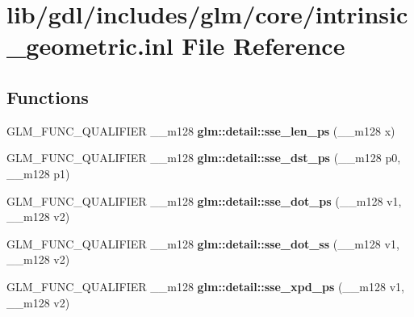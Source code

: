 \hypertarget{intrinsic__geometric_8inl}{}\section{lib/gdl/includes/glm/core/intrinsic\+\_\+geometric.inl File Reference}
\label{intrinsic__geometric_8inl}
\subsection*{Functions}
\begin{DoxyCompactItemize}
\item 
\hypertarget{namespaceglm_1_1detail_aa49baf7bcbe9eb783a85bcd3ce8d8dba}{}G\+L\+M\+\_\+\+F\+U\+N\+C\+\_\+\+Q\+U\+A\+L\+I\+F\+I\+E\+R \+\_\+\+\_\+m128 {\bfseries glm\+::detail\+::sse\+\_\+len\+\_\+ps} (\+\_\+\+\_\+m128 x)\label{namespaceglm_1_1detail_aa49baf7bcbe9eb783a85bcd3ce8d8dba}

\item 
\hypertarget{namespaceglm_1_1detail_a9d4832acb69aa3f67d6e06c64b29dddd}{}G\+L\+M\+\_\+\+F\+U\+N\+C\+\_\+\+Q\+U\+A\+L\+I\+F\+I\+E\+R \+\_\+\+\_\+m128 {\bfseries glm\+::detail\+::sse\+\_\+dst\+\_\+ps} (\+\_\+\+\_\+m128 p0, \+\_\+\+\_\+m128 p1)\label{namespaceglm_1_1detail_a9d4832acb69aa3f67d6e06c64b29dddd}

\item 
\hypertarget{namespaceglm_1_1detail_ad4dfd210b559dcff4cbc4a674477b90b}{}G\+L\+M\+\_\+\+F\+U\+N\+C\+\_\+\+Q\+U\+A\+L\+I\+F\+I\+E\+R \+\_\+\+\_\+m128 {\bfseries glm\+::detail\+::sse\+\_\+dot\+\_\+ps} (\+\_\+\+\_\+m128 v1, \+\_\+\+\_\+m128 v2)\label{namespaceglm_1_1detail_ad4dfd210b559dcff4cbc4a674477b90b}

\item 
\hypertarget{namespaceglm_1_1detail_a794070b64c8a2bd03e393c79be9ed17e}{}G\+L\+M\+\_\+\+F\+U\+N\+C\+\_\+\+Q\+U\+A\+L\+I\+F\+I\+E\+R \+\_\+\+\_\+m128 {\bfseries glm\+::detail\+::sse\+\_\+dot\+\_\+ss} (\+\_\+\+\_\+m128 v1, \+\_\+\+\_\+m128 v2)\label{namespaceglm_1_1detail_a794070b64c8a2bd03e393c79be9ed17e}

\item 
\hypertarget{namespaceglm_1_1detail_a0692599f2cf8b5a9fd64ccf7023805c7}{}G\+L\+M\+\_\+\+F\+U\+N\+C\+\_\+\+Q\+U\+A\+L\+I\+F\+I\+E\+R \+\_\+\+\_\+m128 {\bfseries glm\+::detail\+::sse\+\_\+xpd\+\_\+ps} (\+\_\+\+\_\+m128 v1, \+\_\+\+\_\+m128 v2)\label{namespaceglm_1_1detail_a0692599f2cf8b5a9fd64ccf7023805c7}


\end{DoxyCompactItemize}
